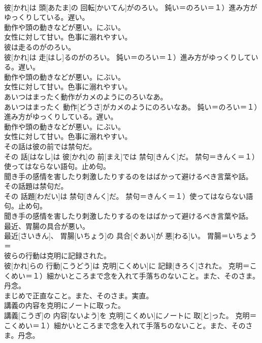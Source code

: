 \documentclass[8pt]{extreport}
\begin{document}
\begin{CJK}{UTF8}{min}
{\\	彼[かれ]は 頭[あたま]の 回転[かいてん]がのろい。	鈍い＝のろい＝１）進み方がゆっくりしている。遅い。 　　　　　　　
\\	動作や頭の動きなどが悪い。にぶい。 　　　　　　　
\\	女性に対して甘い。色事に溺れやすい。
\\	彼は走るのがのろい。	
\\	彼[かれ]は 走[はし]るのがのろい。	鈍い＝のろい＝１）進み方がゆっくりしている。遅い。 　　　　　　　
\\	動作や頭の動きなどが悪い。にぶい。 　　　　　　　
\\	女性に対して甘い。色事に溺れやすい。
\\	あいつはまったく動作がカメのようにのろいなあ。	
\\	あいつはまったく 動作[どうさ]がカメのようにのろいなあ。	鈍い＝のろい＝１）進み方がゆっくりしている。遅い。 　　　　　　　
\\	動作や頭の動きなどが悪い。にぶい。 　　　　　　　
\\	女性に対して甘い。色事に溺れやすい。
\\	その話は彼の前では禁句だ。	
\\	その 話[はなし]は 彼[かれ]の 前[まえ]では 禁句[きんく]だ。	禁句＝きんく＝１）使ってはならない語句。止め句。 　　　　　　　
\\	聞き手の感情を害したり刺激したりするのをはばかって避けるべき言葉や話。
\\	その話題は禁句だ。	
\\	その 話題[わだい]は 禁句[きんく]だ。	禁句＝きんく＝１）使ってはならない語句。止め句。 　　　　　　　
\\	聞き手の感情を害したり刺激したりするのをはばかって避けるべき言葉や話。
\\	最近、胃腸の具合が悪い。	
\\	最近[さいきん]、 胃腸[いちょう]の 具合[ぐあい]が 悪[わる]い。	胃腸＝いちょう＝ 
\\	彼らの行動は克明に記録された。	
\\	彼[かれ]らの 行動[こうどう]は 克明[こくめい]に 記録[きろく]された。	克明＝こくめい＝１）細かいところまで念を入れて手落ちのないこと。また、そのさま。丹念。 　　　　　　　　
\\	まじめで正直なこと。また、そのさま。実直。
\\	講義の内容を克明にノートに取った。	
\\	講義[こうぎ]の 内容[ないよう]を 克明[こくめい]にノートに 取[と]った。	克明＝こくめい＝１）細かいところまで念を入れて手落ちのないこと。また、そのさま。丹念。 　　　　　　　　
}
\end{CJK}
\end{document}
